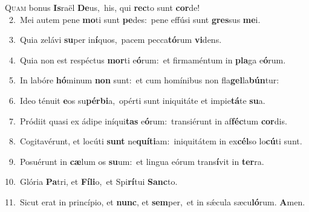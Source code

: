 \lettrine{\initial\textcolor{\initialcolor}{Q}}{uam} bonus \textbf{Is}\-raël \textbf{De}\-us,~\star his, qui \textbf{rec}\-to sunt \textbf{cor}\-de!\\
{\numbfont\textcolor{\numbcolor}{~2.}}~Mei autem pene \textbf{mo}\-ti sunt \textbf{pe}\-des:~\star pene effúsi sunt \textbf{gres}\-sus \textbf{me}\-i.\par
{\numbfont\textcolor{\numbcolor}{~3.}}~Quia zelávi \textbf{su}\-per in\-\textbf{í}\-quos,~\star pacem pecca\-\textbf{tó}\-rum \textbf{vi}\-dens.\par
{\numbfont\textcolor{\numbcolor}{~4.}}~Quia non est respéctus \textbf{mor}\-ti e\-\textbf{ó}\-rum:~\star et firmaméntum in \textbf{pla}\-ga e\-\textbf{ó}\-rum.\par
{\numbfont\textcolor{\numbcolor}{~5.}}~In labóre \textbf{hó}\-minum \textbf{non} sunt:~\star et cum homínibus non fla\-\textbf{gel}\-la\-\textbf{bún}\-tur:\par
{\numbfont\textcolor{\numbcolor}{~6.}}~Ideo ténuit \textbf{e}\-os su\-\textbf{pér}\-\textbf{bi}a,~\star opérti sunt iniquitáte et impie\-\textbf{tá}\-te \textbf{su}\-a.\par
{\numbfont\textcolor{\numbcolor}{~7.}}~Pródiit quasi ex ádipe iníqui\textbf{tas} e\-\textbf{ó}\-rum:~\star transiérunt in af\-\textbf{féc}\-tum \textbf{cor}\-dis.\par
{\numbfont\textcolor{\numbcolor}{~8.}}~Cogitavérunt, et locúti \textbf{sunt} ne\-\textbf{quí}\-\textbf{ti}am:~\star iniquitátem in ex\-\textbf{cél}\-so lo\-\textbf{cú}\-ti sunt.\par
{\numbfont\textcolor{\numbcolor}{~9.}}~Posuérunt in \textbf{cæ}\-lum os \textbf{su}\-um:~\star et lingua eórum trans\-\textbf{í}\-vit in \textbf{ter}\-ra.\par
{\numbfont\textcolor{\numbcolor}{10.}}~Glória \textbf{Pa}\-tri, et \textbf{Fí}\-\textbf{li}o,~\star et Spi\-\textbf{rí}\-tui \textbf{Sanc}\-to.\par
{\numbfont\textcolor{\numbcolor}{11.}}~Sicut erat in princípio, et \textbf{nunc}\-, et \textbf{sem}\-per,~\star et in sǽcula sæcu\-\textbf{ló}\-rum. \textbf{A}\-men.\par
